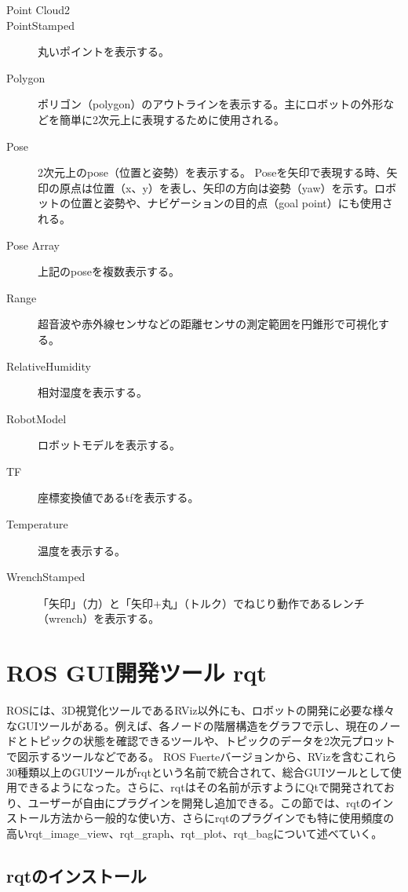 \begin{description}
\item  [Point Cloud2]
\item  [PointStamped]  丸いポイントを表示する。
\item  [Polygon] ポリゴン（polygon）のアウトラインを表示する。主にロボットの外形などを簡単に2次元上に表現するために使用される。
\item  [Pose]  2次元上のpose（位置と姿勢）を表示する。 Poseを矢印で表現する時、矢印の原点は位置（x、y）を表し、矢印の方向は姿勢（yaw）を示す。ロボットの位置と姿勢や、ナビゲーションの目的点（goal point）にも使用される。
\item  [Pose Array]  上記のposeを複数表示する。
\item  [Range] 超音波や赤外線センサなどの距離センサの測定範囲を円錐形で可視化する。
\item  [RelativeHumidity] 相対湿度を表示する。
\item  [RobotModel]  ロボットモデルを表示する。
\item  [TF]  座標変換値であるtfを表示する。
\item  [Temperature] 温度を表示する。
\item  [WrenchStamped] 「矢印」（力）と「矢印+丸」（トルク）でねじり動作であるレンチ（wrench）を表示する。
\end{description}

\section{ROS GUI開発ツール rqt}

ROSには、3D視覚化ツールであるRViz以外にも、ロボットの開発に必要な様々なGUIツールがある。例えば、各ノードの階層構造をグラフで示し、現在のノードとトピックの状態を確認できるツールや、トピックのデータを2次元プロットで図示するツールなどである。
ROS Fuerteバージョンから、RVizを含むこれら30種類以上のGUIツールがrqtという名前で統合されて、総合GUIツールとして使用できるようになった。さらに、rqtはその名前が示すようにQtで開発されており、ユーザーが自由にプラグインを開発し追加できる。この節では、rqtのインストール方法から一般的な使い方、さらにrqtのプラグインでも特に使用頻度の高いrqt\_image\_view、rqt\_graph、rqt\_plot、rqt\_bagについて述べていく。

\subsection{rqtのインストール}

